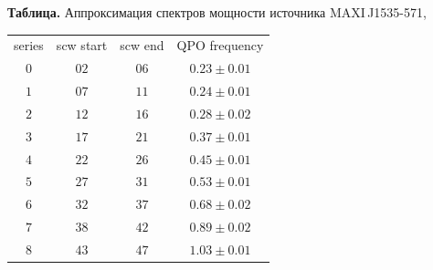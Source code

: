 \documentclass{pazhb}
\begin{document}
\begin{table}[t]

\vspace{6mm}
\centering
{{\bf Таблица.} Аппроксимация спектров мощности
источника \mbox{MAXI\,J1535-571},\protect\\}

\vspace{5mm}\begin{tabular}{c|c|c|c} \hline\hline
series & scw start & scw end & QPO frequency\\
$0$ & $02$ & $06$ & $0.23\pm 0.01 $ \\
$1$ & $07$ & $11$ & $0.24\pm 0.01 $ \\
$2$ & $12$ & $16$ & $0.28\pm 0.02 $ \\
$3$ & $17$ & $21$ & $0.37\pm 0.01 $ \\
$4$ & $22$ & $26$ & $0.45\pm 0.01 $ \\
$5$ & $27$ & $31$ & $0.53\pm 0.01 $ \\
$6$ & $32$ & $37$ & $0.68\pm 0.02 $ \\
$7$ & $38$ & $42$ & $0.89\pm 0.02 $ \\
$8$ & $43$ & $47$ & $1.03\pm 0.01 $ \\
\hline

\end{tabular}
\end{table}







\acknowledgements

\label{lastpage}




\end{document}

